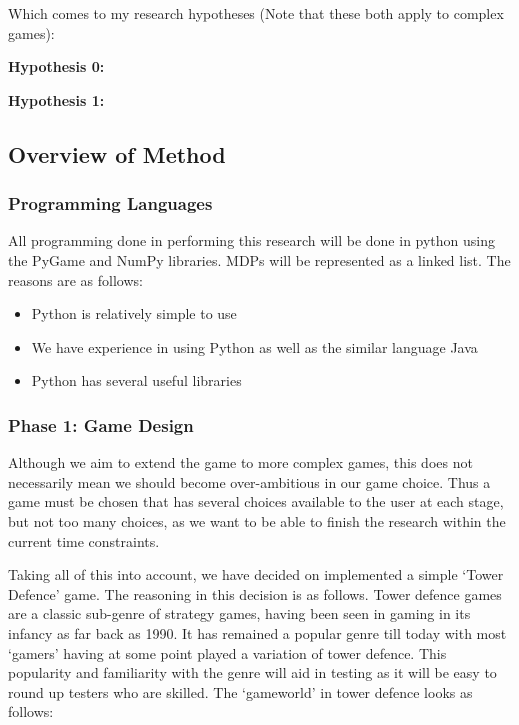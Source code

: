 \documentclass[11pt]{article}
\begin{document}
Which comes to my research hypotheses (Note that these both apply to complex games):

\vspace{6.0 mm}

\begin{flushleft}
\textbf{
Hypothesis 0:} 

\vspace{4.0 mm}

\textbf{
Hypothesis 1:} 
\end{flushleft}

\vspace{6.0 mm}

\subsection{Overview of Method}
\subsubsection{Programming Languages}
All programming done in performing this research will be done in python using the PyGame and NumPy libraries. MDPs will be represented as a linked list. The reasons are as follows:
\begin{itemize}
\item Python is relatively simple to use
\item We have experience in using Python as well as the similar language Java
\item Python has several useful libraries
\end{itemize}
\subsubsection{Phase 1: Game Design}
Although we aim to extend the game to more complex games, this does not necessarily mean we should become over-ambitious in our game choice. Thus a game must be chosen that has several choices available to the user at each stage, but not too many choices, as we want to be able to finish the research within the current time constraints.
\vspace{6.0 mm}

Taking all of this into account, we have decided on implemented a simple `Tower Defence' game. The reasoning in this decision is as follows. Tower defence games are a classic sub-genre of strategy games, having been seen in gaming in its infancy as far back as 1990. It has remained a popular genre till today with most `gamers' having at some point played a variation of tower defence. This popularity and familiarity with the genre will aid in testing as it will be easy to round up testers who are skilled.
\vspace{3.0 mm}
The `gameworld' in tower defence looks as follows:
\end{document}
